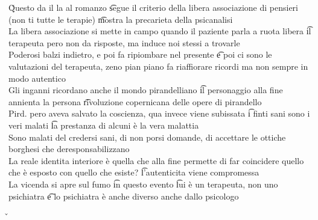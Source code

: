 \documentclass[12pt]{article}
\begin{document}
\v

Questo da il la al romanzo \t segue il criterio della libera associazione di pensieri (non ti tutte le terapie) \t mostra la precarieta della psicanalisi \\
La libera associazione si mette in campo quando il paziente parla a ruota libera \t il terapeuta pero non da risposte, ma induce noi stessi a trovarle \\
Poderosi balzi indietro, e poi fa ripiombare nel presente \t e poi ci sono le valutazioni del terapeuta, zeno pian piano fa riaffiorare ricordi ma non sempre in modo autentico \\
Gli inganni ricordano anche il mondo pirandelliano \t il personaggio alla fine annienta la persona \t rivoluzione copernicana delle opere di pirandello \\
Pird. pero aveva salvato la coscienza, qua invece viene subissata \t i finti sani sono i veri malati \t la prestanza di alcuni è la vera malattia \\
Sono malati del credersi sani, di non porsi domande, di accettare le ottiche borghesi che deresponsabilizzano \\
La reale identita interiore è quella che alla fine permette di far coincidere quello che è esposto con quello che esiste? \t l'autenticita viene compromessa \\
La vicenda si apre sul fumo \t in questo evento \t lui è un terapeuta, non uno psichiatra \t e lo psichiatra è anche diverso anche dallo psicologo

\v
\end{document}

